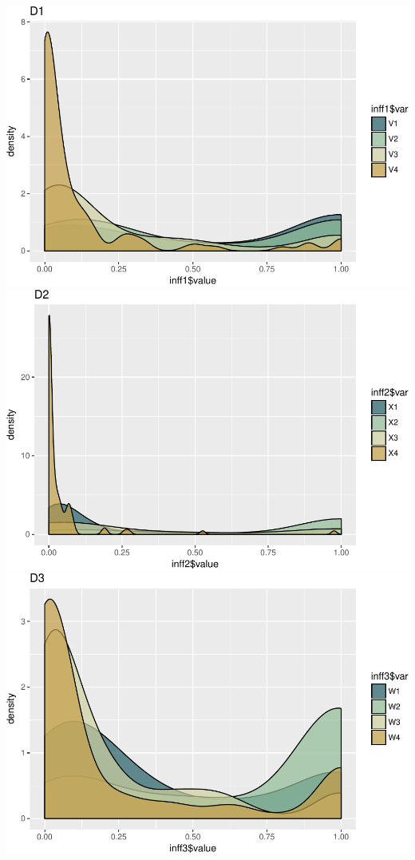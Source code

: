 \documentclass[12pt,twoside]{reedthesis}
\begin{document}
  \includegraphics{Thesis_files/figure-latex/figinfdists-1.pdf}
  \includegraphics{Thesis_files/figure-latex/figinfdists-2.pdf}
  \includegraphics{Thesis_files/figure-latex/figinfdists-3.pdf}
  
\end{document}
